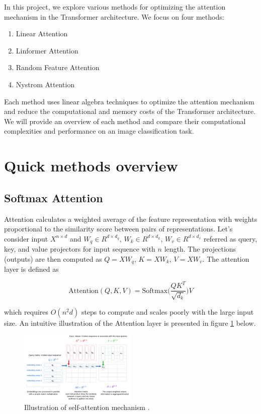 In this project, we explore various methods for optimizing the attention mechanism in the Transformer architecture. We focus on four methods: 
\begin{enumerate}
\item Linear Attention
\item Linformer Attention
\item Random Feature Attention
\item Nystrom Attention
\end{enumerate}
Each method uses linear algebra techniques to optimize the attention mechanism and reduce the computational and memory costs of the Transformer architecture. We will provide an overview of each method and compare their computational complexities and performance on an image classification task.


\section{Quick methods overview}

\subsection{Softmax Attention}

Attention calculates a weighted average of the feature representation with weights proportional to the similarity score between pairs of representations. Let’s consider input $X^{n \times d}$ and $W_q \in R^{d \times d_q}$, $W_k \in R^{d \times d_k}$, $W_v \in R^{d \times d_v}$ referred as query, key, and value projectors for input sequence with $n$ length. The projections (outputs) are then computed as $Q=XW_q$, $K=XW_k$, $V=XW_v$.
The attention layer is defined as 

$$ \text{Attention}(Q, K, V) = \text{Softmax} \big( \frac{QK^T}{\sqrt{d_k}} \big)V $$ 

which requires $O(n^2d)$ steps to compute and scales poorly with the large input size. An intuitive illustration of the Attention layer is presented in figure \ref{fig:self-attention} below.

\begin{figure}[h]
\centering
\includegraphics[width=0.5\textwidth]{self-attention-explained.png}
\caption{\label{fig:self-attention}Illustration of self-attention mechanism \cite{self-attention-explained}.}
\end{figure}

